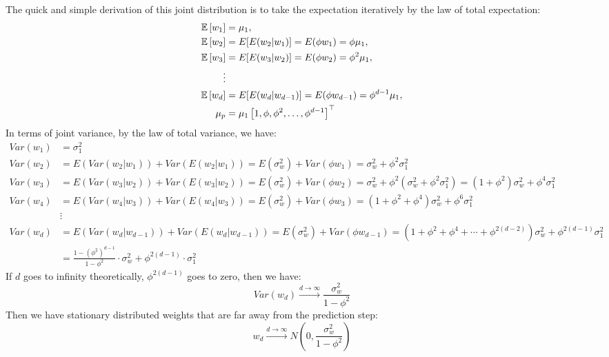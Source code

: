 \documentclass{article}
\begin{document}
The quick and simple derivation of this joint distribution is to take the expectation iteratively by the law of total expectation:
$$\begin{aligned}
\mathbb{E}\left[w_1\right] & =\mu_1, \\
\mathbb{E}\left[w_2\right] & = E[E(w_2|w_1)]=E(\phi w_{1})=\phi \mu_1, \\
\mathbb{E}\left[w_3\right] & = E[E(w_3|w_2)]=E(\phi w_{2})=\phi^2 \mu_1, \\
\vdots & \\
\mathbb{E}\left[w_d\right] & = E[E(w_d|w_{d-1})]=E(\phi w_{d-1})= \phi^{d-1} \mu_1 ,\\
\mu_p&=\mu_1\left[1, \phi, \phi^2, \ldots, \phi^{d-1}\right]^{\top}
\end{aligned}\\
$$
In terms of joint variance, by the law of total variance, we have:
$$\begin{aligned}
    Var(w_1) &= \sigma_1^2 \\
    Var(w_2) &= E(Var(w_2|w_1)) + Var(E(w_2|w_1)) = E(\sigma^2_w)+Var(\phi w_1)=\sigma^2_w+\phi^2 \sigma^2_1 \\
    Var(w_3) &= E(Var(w_3|w_2)) + Var(E(w_3|w_2)) = E(\sigma^2_w)+Var(\phi w_2)=\sigma^2_w+\phi^2 (\sigma^2_w+\phi^2 \sigma^2_1)=(1+\phi^2)\sigma^2_w + \phi^4\sigma^2_1 \\
    Var(w_4) &= E(Var(w_4|w_3)) + Var(E(w_4|w_3)) = E(\sigma^2_w)+Var(\phi w_3)=(1+\phi^2+\phi^4)\sigma^2_w + \phi^6\sigma^2_1 \\
    &\vdots \\
    Var(w_d) &= E(Var(w_d|w_{d-1})) + Var(E(w_d|w_{d-1})) = E(\sigma^2_w)+Var(\phi w_{d-1})=(1+\phi^2+\phi^4+\cdots+\phi^{2(d-2)})\sigma^2_w + \phi^{2(d-1)}\sigma^2_1\\
    &= \frac{1-(\phi^2)^{d-1}}{1-\phi^2}\cdot \sigma_w^2 + \phi^{2(d-1)}\cdot\sigma_1^2
\end{aligned}$$
If $d$ goes to infinity theoretically, $\phi^{2(d-1)}$ goes to zero, then we have: $$Var(w_d) \xrightarrow{d\rightarrow\infty} \frac{\sigma_w^2}{1-\phi^2}$$ 
Then we have stationary distributed weights that are far away from the prediction step:
$$w_d \xrightarrow{d\rightarrow\infty} N\left(0, \frac{\sigma_w^2}{1-\phi^2}\right)$$
\end{document}
